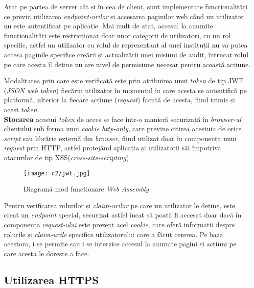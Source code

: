 Atat pe partea de server cât și în cea de client, sunt implementate funcționalități ce previn utilizarea \textit{endpoint-urilor} și accesarea paginilor web când un utilizator nu este autentificat pe aplicație. Mai mult de atat, accesul la anumite funcționalități este restricționat doar unor categorii de utilizatori, cu un rol specific, astfel un utilizator cu rolul de reprezentant al unei instituții nu va putea accesa paginile specifice creării și actualizării unei misiuni de audit, întrucat rolul pe care acesta îl detine nu are nivel de permisiune necesar pentru această acțiune.

Modalitatea prin care este verificată este prin atribuirea unui \textit{token} de tip JWT (\textit{JSON web token}) fiecărui utilizator în momentul în care acesta se autentifică pe platformă, ulterior la fiecare acțiune (\textit{request}) facută de acesta, fiind trimis și acest \textit{token}.\\



\textbf{Stocarea} acestui \textit{token} de acces se face într-o manieră securizată în \textit{browser-ul} clientului sub forma unui \textit{cookie http-only}, care previne citirea acestuia de orice \textit{script} sau librărie externă din \textit{browser}, fiind utilizat doar în componența unui \textit{request} prin HTTP, astfel protejând aplicația și utilizatorii săi împotriva atacurilor de tip XSS(\textit{cross-site-scripting}).

\vspace{1cm}
\begin{figure}[h]
	\centering
	
	\texttt{[image: c2/jwt.jpg]}
	\caption{Diagramă mod functionare \textit{Web Assembly}}
\end{figure}

Pentru verificarea rolurilor și \textit{claim-urilor} pe care un utilizator le deține, este creat un \textit{endpoint} special, securizat astfel încat să poată fi accesat doar dacă în componența \textit{request-ului} este prezent acel \textit{cookie}, care oferă informatii despre rolurile și \textit{claim-urile} specifice utilizatorului care a făcut cererea. Pe baza acestora, i se permite sau i se interzice accesul la anumite pagini și acțiuni pe care acesta le dorește a face.


\subsection*{Utilizarea HTTPS}

